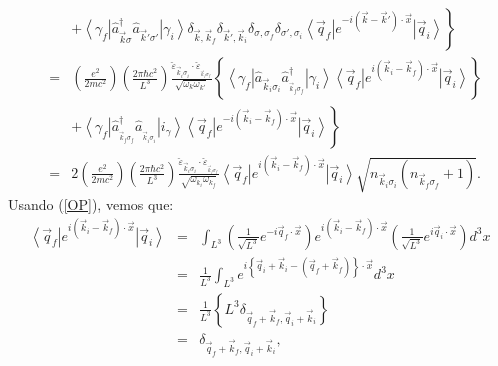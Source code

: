 \begin{eqnarray}
&&\left.+\left\langle \gamma_f\right|
\hat{a}_{\vec{k}\sigma}^\dagger \hat{a}_{\vec{k}'\sigma '}\left|
\gamma_i\right\rangle 
\delta_{\vec{k},\vec{k}_f}\delta_{\vec{k}',\vec{k}_i}\delta_{\sigma,\sigma_{
f}}\delta_{\sigma ',\sigma_i}\left\langle \vec{q}_f\right| e^{-i\left(
\vec{k}-\vec{k}'\right) \cdot\vec{x}}\left| \vec{q}_i\right\rangle \right\}
\nonumber\\
& = &\left( \frac{e^2}{2mc^2}\right) \left( \frac{2\pi\hbar c^2}%
{L^3}\right) \frac{\check{\varepsilon}_{\vec{k}_i\sigma_i}\cdot
\check{\varepsilon}_{_{\vec{k}_f\sigma_f}}}{\sqrt{\omega_k\omega_{k'}}}
\left\{\left\langle \gamma_f\right| \hat{a}_{\vec{k}_i\sigma_i}
\hat{a}_{_{\vec{k}_f\sigma_f}}^\dagger \left| \gamma_i\right\rangle \left\langle
\vec{q}_f\right| e^{i\left(
\vec{k}_i-\vec{k}_f\right) \cdot\vec{x}}\left| \vec{q}_i\right\rangle \right\}
\nonumber\\
&&\left.+\left\langle\gamma_f\right|\hat{a}_{_{\vec{k}_f\sigma_f}}^\dagger
\hat{a}_{_{\vec{k}_{i}\sigma_i}}\left| i_\gamma\right\rangle 
\left\langle \vec{q}_f\right| e^{-i\left(
\vec{k}_i-\vec{k}_f\right) \cdot\vec{x}}\left| \vec{q}_i%
\right\rangle \right\} \nonumber\\
& = &2\left( \frac{e^2}{2mc^2}\right) \left( \frac{2\pi\hbar c^2%
}{L^3}\right) \frac{\check{\varepsilon}_{\vec{k}_i\sigma_i}\cdot
\check{\varepsilon}_{_{\vec{k}_f\sigma_f}}}{\sqrt{\omega_{k_i}%
\omega_{k_f}}}\left\langle \vec{q}_f\right| e^{i\left( \vec{k}%
_i-\vec{k}_f\right) \cdot\vec{x}}\left| \vec{q}_i\right\rangle 
\sqrt{n_{\vec{k}_i\sigma_i}\left( n_{\vec{k}_f\sigma_f}+1\right)
}.\label{<qf|H2|qi>}
\end{eqnarray}
Usando (\ref{OP}), vemos que:%
\begin{eqnarray}
\left\langle \vec{q}_f\right| e^{i\left( \vec{k}_i-\vec{k}%
_f\right) \cdot\vec{x}}\left| \vec{q}_i\right\rangle  & = &\int
_{L^3}\left( \frac{1}{\sqrt{L^3}}e^{-i\vec{q}_f\cdot\vec{x}}\right)
e^{i\left( \vec{k}_i-\vec{k}_f\right) \cdot\vec{x}}\left( \frac
{1}{\sqrt{L^3}}e^{i\vec{q}_i\cdot\vec{x}}\right) d^3x\nonumber\\
& = &\frac{1}{L^3}\int_{L^3}e^{i\left\{ \vec{q}_i+\vec{k}_i-\left(
\vec{q}_f+\vec{k}_f\right) \right\} \cdot\vec{x}}d^3x\nonumber\\
& = &\frac{1}{L^3}\left\{ L^3\delta_{\vec{q}_f+\vec{k}_f,\vec{q}%
_i+\vec{k}_i}\right\} \nonumber\\
& = &\delta_{\vec{q}_f+\vec{k}_f,\vec{q}_i+\vec{k}_i},\label{<qf|2|qi>}%
\end{eqnarray}
